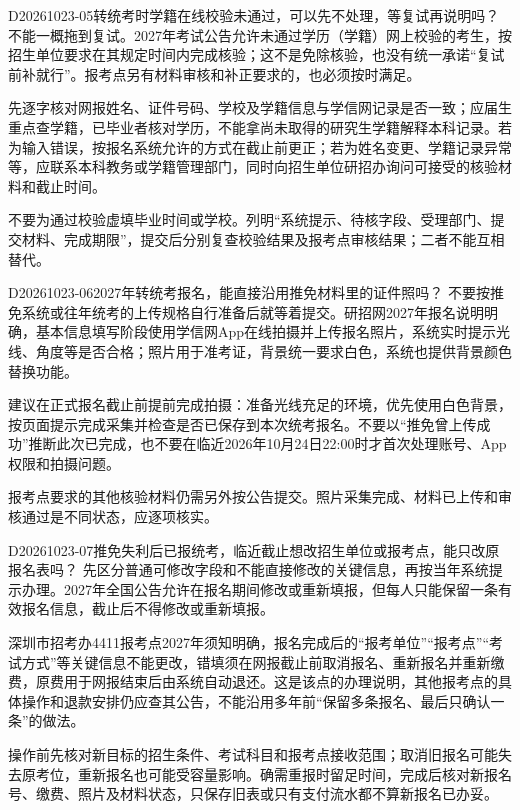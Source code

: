 \begin{qa}{D20261023-05}{转统考时学籍在线校验未通过，可以先不处理，等复试再说明吗？}
不能一概拖到复试。2027年考试公告允许未通过学历（学籍）网上校验的考生，按招生单位要求在其规定时间内完成核验；这不是免除核验，也没有统一承诺“复试前补就行”。报考点另有材料审核和补正要求的，也必须按时满足。

先逐字核对网报姓名、证件号码、学校及学籍信息与学信网记录是否一致；应届生重点查学籍，已毕业者核对学历，不能拿尚未取得的研究生学籍解释本科记录。若为输入错误，按报名系统允许的方式在截止前更正；若为姓名变更、学籍记录异常等，应联系本科教务或学籍管理部门，同时向招生单位研招办询问可接受的核验材料和截止时间。

不要为通过校验虚填毕业时间或学校。列明“系统提示、待核字段、受理部门、提交材料、完成期限”，提交后分别复查校验结果及报考点审核结果；二者不能互相替代。
\end{qa}

\begin{qa}{D20261023-06}{2027年转统考报名，能直接沿用推免材料里的证件照吗？}
不要按推免系统或往年统考的上传规格自行准备后就等着提交。研招网2027年报名说明明确，基本信息填写阶段使用学信网App在线拍摄并上传报名照片，系统实时提示光线、角度等是否合格；照片用于准考证，背景统一要求白色，系统也提供背景颜色替换功能。

建议在正式报名截止前提前完成拍摄：准备光线充足的环境，优先使用白色背景，按页面提示完成采集并检查是否已保存到本次统考报名。不要以“推免曾上传成功”推断此次已完成，也不要在临近2026年10月24日22:00时才首次处理账号、App权限和拍摄问题。

报考点要求的其他核验材料仍需另外按公告提交。照片采集完成、材料已上传和审核通过是不同状态，应逐项核实。
\end{qa}

\begin{qa}{D20261023-07}{推免失利后已报统考，临近截止想改招生单位或报考点，能只改原报名表吗？}
先区分普通可修改字段和不能直接修改的关键信息，再按当年系统提示办理。2027年全国公告允许在报名期间修改或重新填报，但每人只能保留一条有效报名信息，截止后不得修改或重新填报。

深圳市招考办4411报考点2027年须知明确，报名完成后的“报考单位”“报考点”“考试方式”等关键信息不能更改，错填须在网报截止前取消报名、重新报名并重新缴费，原费用于网报结束后由系统自动退还。这是该点的办理说明，其他报考点的具体操作和退款安排仍应查其公告，不能沿用多年前“保留多条报名、最后只确认一条”的做法。

操作前先核对新目标的招生条件、考试科目和报考点接收范围；取消旧报名可能失去原考位，重新报名也可能受容量影响。确需重报时留足时间，完成后核对新报名号、缴费、照片及材料状态，只保存旧表或只有支付流水都不算新报名已办妥。
\end{qa}

